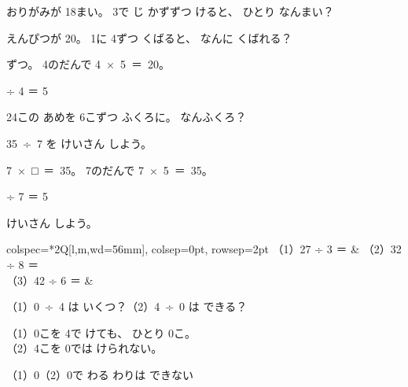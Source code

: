 \begin{jibun}
おりがみが 18まい。 3で じ かずずつ けると、 ひとり なんまい？
\bkshikiran
{}
\end{jibun}

\begin{reidai}[なん\R{人}{にん}に \R{分}{わ}けられる]
えんぴつが 20。 1に 4ずつ くばると、 なんに くばれる？

ずつ。 4のだんで \mbox{4 × 5 ＝ 20}。

 ÷ 4 ＝ 5 
\end{reidai}

\begin{jibun}
24この あめを 6こずつ ふくろに。 なんふくろ？
\bkshikiran
{}
\end{jibun}

\begin{reidai}
\mbox{35 ÷ 7} を けいさん しよう。

\kangaekata \mbox{7 × □ ＝ 35}。 7のだんで \mbox{7 × 5 ＝ 35}。

 ÷ 7 ＝ 5 
\end{reidai}

\begin{jibun}
けいさん しよう。\par\vspace{2pt}
\noindent\hspace*{1\zw}\begin{tblr}{colspec={*{2}{Q[l,m,wd=56mm]}}, colsep=0pt, rowsep=2pt}
（1）27 ÷ 3 ＝ \bkkakikomi & （2）32 ÷ 8 ＝ \bkkakikomi \\
（3）42 ÷ 6 ＝ \bkkakikomi & \\
\end{tblr}
\end{jibun}

\begin{reidai}[0の わり\R{算}{ざん}]
（1）\mbox{0 ÷ 4} は いくつ？\hspace{2\zw}（2）\mbox{4 ÷ 0} は できる？

\kangaekata （1）0こを 4で けても、 ひとり 0こ。\\
\bkqmkindent（2）4こを 0では けられない。

\kotae （1）0\hspace{2\zw}（2）0で わる わりは できない
\end{reidai}

